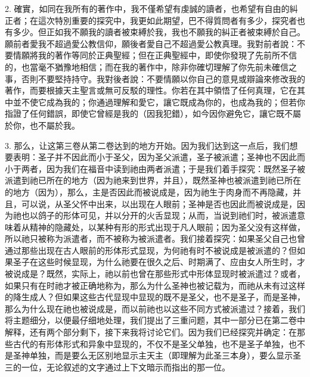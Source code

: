 2. 確實，如同在我所有的著作中，我不僅希望有虔誠的讀者，也希望有自由的糾正者；在這次特別重要的探究中，我更如此期望，巴不得質問者有多少，探究者也有多少。但正如我不願我的讀者被束縛於我，我也不願我的糾正者被束縛於自己。願前者愛我不超過愛公教信仰，願後者愛自己不超過愛公教真理。我對前者說：不要情願將我的著作等同於正典聖經；但在正典聖經中，即使你發現了先前所不信的，也當毫不猶豫地相信；而在我的著作中，除非你確切理解了你先前未確信之事，否則不要堅持持守。我對後者說：不要情願以你自己的意見或辯論來修改我的著作，而要根據天主聖言或無可反駁的理性。你若在其中領悟了任何真理，它在其中並不使它成為我的；你通過理解和愛它，讓它既成為你的，也成為我的；但若你指證了任何錯誤，即使它曾經是我的（因我犯錯），如今因你避免它，讓它既不屬於你，也不屬於我。\par

3. 那么，让这第三卷从第二卷达到的地方开始。因为我们达到这一点后，我们想要表明：圣子并不因此而小于圣父，因为圣父派遣，圣子被派遣；圣神也不因此而小于两者，因为我们在福音中读到祂由两者派遣；于是我们着手探究：既然圣子被派遣到祂已所在的地方（因为祂来到世界，并且），既然圣神也被派遣到祂已所在的地方（因为），那么，主是否因此而被说成是，因为祂生于肉身而不再隐藏，并且，可以说，从圣父怀中出来，以出现在人眼前；圣神是否也因此而被说成是，因为祂也以鸽子的形体可见，并以分开的火舌显现；从而，当说到祂们时，被派遣意味着从精神的隐藏处，以某种有形的形式出现于凡人眼前；因为圣父没有这样做，所以祂只被称为派遣者，而不被称为被派遣者。我们接着探究：如果圣父自己也曾通过那些出现在古人眼前的形体形式显现，为何祂有时不被说成是被派遣的？但如果圣子在这些时候显现，为什么祂要在很久之后、时期满了、应由女人所生时，才被说成是？既然，实际上，祂以前也曾在那些形式中形体显现时被派遣过？或者，如果只有在时祂才被正确地称为，那么为什么圣神也被记载为，而祂从未有过这样的降生成人？但如果这些古代显现中显现的既不是圣父，也不是圣子，而是圣神，那么为什么现在祂也被说成是，而以前祂也以这些不同方式被派遣过？接着，我们将主题细分，以便最仔细地处理，我们提出了三重问题，其中一部分已在第二卷中解释，还有两个部分剩下，接下来我将讨论它们。因为我们已经探究并确定：在那些古代的有形体形式和异象中显现的，不仅不是圣父单独，也不是圣子单独，也不是圣神单独，而是要么无区别地显示主天主（即理解为此圣三本身），要么显示圣三的一位，无论叙述的文字通过上下文暗示而指出的那一位。\par


